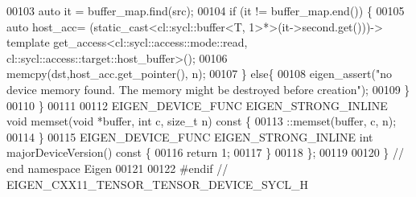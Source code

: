 \begin{DoxyCode}
00103     \textcolor{keyword}{auto} it = buffer\_map.find(src);
00104     \textcolor{keywordflow}{if} (it != buffer\_map.end()) \{
00105       \textcolor{keyword}{auto} host\_acc= (\textcolor{keyword}{static\_cast<}cl::sycl::buffer<T, 1>*\textcolor{keyword}{>}(it->second.get()))-> \textcolor{keyword}{template} 
      get\_access<cl::sycl::access::mode::read, cl::sycl::access::target::host\_buffer>();
00106       memcpy(dst,host\_acc.get\_pointer(),  n);
00107     \} \textcolor{keywordflow}{else}\{
00108       eigen\_assert(\textcolor{stringliteral}{"no device memory found. The memory might be destroyed before creation"});
00109     \}
00110   \}
00111 
00112   EIGEN\_DEVICE\_FUNC EIGEN\_STRONG\_INLINE \textcolor{keywordtype}{void} memset(\textcolor{keywordtype}{void} *buffer, \textcolor{keywordtype}{int} c, \textcolor{keywordtype}{size\_t} n)\textcolor{keyword}{ const }\{
00113     ::memset(buffer, c, n);
00114   \}
00115   EIGEN\_DEVICE\_FUNC EIGEN\_STRONG\_INLINE \textcolor{keywordtype}{int} majorDeviceVersion()\textcolor{keyword}{ const }\{
00116   \textcolor{keywordflow}{return} 1;
00117   \}
00118 \};
00119 
00120 \}  \textcolor{comment}{// end namespace Eigen}
00121 
00122 \textcolor{preprocessor}{#endif  // EIGEN\_CXX11\_TENSOR\_TENSOR\_DEVICE\_SYCL\_H}
\end{DoxyCode}
